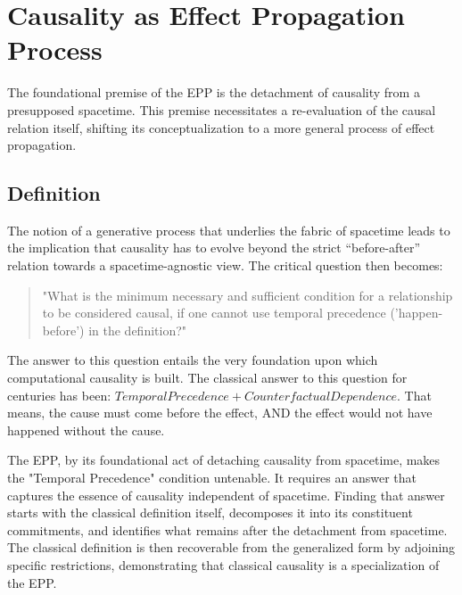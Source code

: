 %
%

\section{Causality as Effect Propagation Process}
\label{sec:epp}

The foundational premise of the EPP is the detachment of causality from a presupposed spacetime. 
This premise necessitates a re-evaluation of the causal relation itself, shifting its conceptualization to a more general process of effect propagation. 
 
%
\subsection{Definition}
\label{sec:epp_definition}

The notion of a generative process that underlies the fabric of spacetime leads to the implication that causality has to evolve beyond the strict “before-after” relation towards a spacetime-agnostic view. The critical question then becomes:

\begin{quote}
	"What is the minimum necessary and sufficient condition for a relationship to be considered causal, 
	if one cannot use temporal precedence ('happen-before') in the definition?"
\end{quote}

The answer to this question entails the very foundation upon which computational causality is built. 
The classical answer to this question for centuries has been: $Temporal Precedence + Counterfactual Dependence$.
That means, the cause must come before the effect, AND the effect would not have happened without the cause. 

The EPP, by its foundational act of detaching causality from spacetime, makes the "Temporal Precedence" condition untenable. It requires an answer that captures the essence of causality independent of spacetime. Finding that answer starts with the classical definition itself, decomposes it into its constituent commitments, and identifies what remains after the detachment from spacetime. The classical definition is then recoverable from the generalized form by adjoining specific restrictions, demonstrating that classical causality is a specialization of the EPP.


